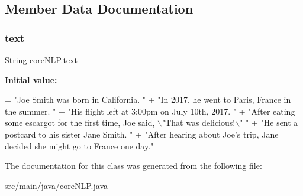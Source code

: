 \subsection{Member Data Documentation}
\mbox{\label{classcoreNLP_a541cb8188bc1e2749ccca038dd172f46}} 
\subsubsection{\texorpdfstring{text}{text}}
{\footnotesize\ttfamily String core\+N\+L\+P.\+text\hspace{0.3cm}{\ttfamily [static]}}

{\bfseries Initial value\+:}
\begin{DoxyCode}
= \textcolor{stringliteral}{"Joe Smith was born in California. "} +
        \textcolor{stringliteral}{"In 2017, he went to Paris, France in the summer. "} +
        \textcolor{stringliteral}{"His flight left at 3:00pm on July 10th, 2017. "} +
        \textcolor{stringliteral}{"After eating some escargot for the first time, Joe said, \(\backslash\)"That was delicious!\(\backslash\)" "} +
        \textcolor{stringliteral}{"He sent a postcard to his sister Jane Smith. "} +
        \textcolor{stringliteral}{"After hearing about Joe's trip, Jane decided she might go to France one day."}
\end{DoxyCode}


The documentation for this class was generated from the following file\+:\begin{DoxyCompactItemize}
\item 
src/main/java/core\+N\+L\+P.\+java\end{DoxyCompactItemize}
